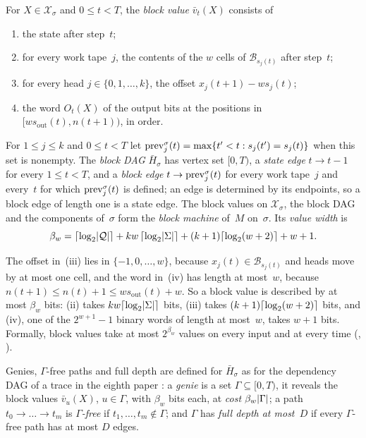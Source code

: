 \begin{definition}\label{def:block-machine}
For $X\in\mathcal X_\sigma$ and $0\le t<T$, the \emph{block value} $\bar v_t(X)$ consists of
\begin{enumerate}[label=(\roman*)]
\item the state after step~$t$;
\item for every work tape~$j$, the contents of the $w$ cells of $\mathcal B_{s_j(t)}$ after step~$t$;
\item for every head $j\in\{0,1,\dots,k\}$, the offset $x_j(t+1)-ws_j(t)$;
\item the word $O_t(X)$ of the output bits at the positions in $[ws_{\mathrm{out}}(t),n(t+1))$, in order.
\end{enumerate}
For $1\le j\le k$ and $0\le t<T$ let $\mathrm{prev}^\sigma_j(t)=\max\{t'<t:s_j(t')=s_j(t)\}$ when this set is nonempty. The
\emph{block DAG} $\bar H_\sigma$ has vertex set $[0,T)$, a \emph{state edge} $t\to t-1$ for every $1\le t<T$, and a
\emph{block edge} $t\to\mathrm{prev}^\sigma_j(t)$ for every work tape~$j$ and every~$t$ for which $\mathrm{prev}^\sigma_j(t)$ is
defined; an edge is determined by its endpoints, so a block edge of length one is a state edge. The block values on
$\mathcal X_\sigma$, the block DAG and the components of~$\sigma$ form the \emph{block machine} of~$M$ on~$\sigma$. Its
\emph{value width} is
\[
  \beta_w=\lceil \log_2 \lvert \mathcal Q \rvert \rceil+kw\,\lceil \log_2 \lvert \Sigma \rvert \rceil+(k+1)\lceil \log_2 (w+2) \rceil+w+1 .
\]
\end{definition}

The offset in~(iii) lies in $\{-1,0,\dots,w\}$, because $x_j(t)\in\mathcal B_{s_j(t)}$ and heads move by at most one
cell, and the word in~(iv) has length at most~$w$, because $n(t+1)\le n(t)+1\le ws_{\mathrm{out}}(t)+w$. So a block
value is described by at most $\beta_w$ bits: (ii) takes $kw\lceil \log_2 \lvert \Sigma \rvert \rceil$ bits, (iii) takes $(k+1)\lceil \log_2 (w+2) \rceil$
bits, and (iv), one of the $2^{w+1}-1$ binary words of length at most~$w$, takes $w+1$ bits. Formally, block values take
at most $2^{\beta_w}$ values on every input and at every time (,
).

Genies, $\Gamma$-free paths and full depth are defined for $\bar H_\sigma$ as for the dependency DAG of a trace in the
eighth paper \cite[Section~2.4]{BoundedNesting2026}: a \emph{genie} is a set $\Gamma\subseteq[0,T)$, it reveals the
block values $\bar v_u(X)$, $u\in\Gamma$, with $\beta_w$ bits each, at \emph{cost} $\beta_w\lvert \Gamma \rvert$; a path
$t_0\to\dots\to t_m$ is \emph{$\Gamma$-free} if $t_1,\dots,t_m\notin\Gamma$; and $\Gamma$ has \emph{full depth at
most~$D$} if every $\Gamma$-free path has at most $D$ edges.

